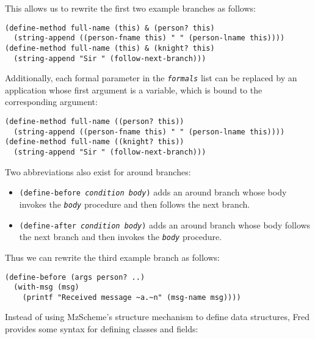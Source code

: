 \documentclass{article}
\newcommand{\code}[1]{\texttt{#1}}
\newcommand{\parm}[1]{\code{\textit{#1}}}
\begin{document}
This allows us to rewrite the first two example branches as follows:

\begin{verbatim}
(define-method full-name (this) & (person? this)
  (string-append ((person-fname this) " " (person-lname this))))
(define-method full-name (this) & (knight? this)
  (string-append "Sir " (follow-next-branch)))
\end{verbatim}

Additionally, each formal parameter in the \parm{formals} list can be
replaced by an application whose first argument is a variable, which
is bound to the corresponding argument:

\begin{verbatim}
(define-method full-name ((person? this))
  (string-append ((person-fname this) " " (person-lname this))))
(define-method full-name ((knight? this))
  (string-append "Sir " (follow-next-branch)))
\end{verbatim}

Two abbreviations also exist for around branches:

\begin{itemize}
\item \code{(define-before \parm{condition} \parm{body})} adds an
      around branch whose body invokes the \parm{body} procedure and
      then follows the next branch.
\item \code{(define-after \parm{condition} \parm{body})} adds an
      around branch whose body follows the next branch and then
      invokes the \parm{body} procedure.
\end{itemize}

Thus we can rewrite the third example branch as follows:

\begin{verbatim}
(define-before (args person? ..)
  (with-msg (msg)
    (printf "Received message ~a.~n" (msg-name msg))))
\end{verbatim}

Instead of using MzScheme's structure mechanism to define data
structures, Fred provides some syntax for defining classes and fields:
\end{document}
